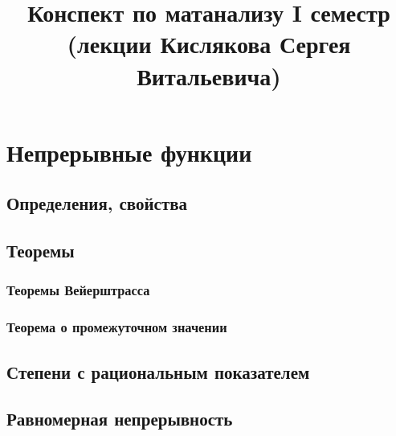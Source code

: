 \documentclass[12pt]{report}
\title{Конспект по матанализу I семестр\\ (лекции Кислякова Сергея Витальевича)}
\begin{document}
\maketitle
\clearpage
\tableofcontents
\clearpage

\renewcommand{\proofname}{Proof}

\theoremstyle{plain}
\newtheorem{thm}{Theorem}[section]
\newtheorem*{aks}{Аксиома}[section]
\newtheorem*{lm}{Lemma}
\newtheorem*{st}{Statement}
\newtheorem*{prop}{Property}

\theoremstyle{definition}
\newtheorem{defn}{Def}
\newtheorem*{ex}{Example}
\newtheorem*{exs}{Examples}
\newtheorem*{cor}{Corollary}
\newtheorem*{name}{Name}

\theoremstyle{remark}
\newtheorem*{rem}{Remain}
\newtheorem*{note}{Note}
\newtheorem*{probl}{Exercise}

\newcommand{\Z}{\mathbb{Z}}
\newcommand{\N}{\mathbb{N}}
\newcommand{\R}{\mathbb{R}}
\newcommand{\Q}{\mathbb{Q}}
\newcommand{\K}{\mathbb{K}}
\newcommand{\Cm}{\mathbb{C}}
\newcommand{\Pm}{\mathbb{P}}
\newcommand{\ilim}{\int\limits}
\newcommand{\slim}{\sum\limits}
\newcommand{\pivi}{\stackrel \circ }

\chapter{Непрерывные функции}
\section{Определения, свойства}
\section{Теоремы}
\subsection{Теоремы Вейерштрасса}
\subsection{Теорема о промежуточном значении}
\section{Степени с рациональным показателем}
\section{Равномерная непрерывность}
\end{document}
